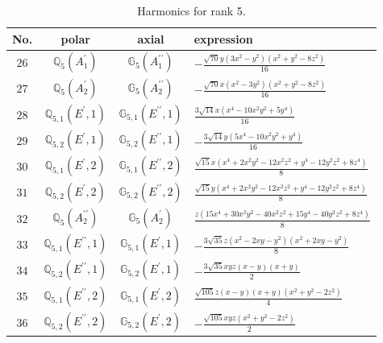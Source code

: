 \documentclass[fleqn,8pt,landscape]{jsarticle}
\begin{document}
\begin{table}[ht!]
\begin{center}
\caption{Harmonics for rank 5.}
\renewcommand{\arraystretch}{1.3}
\begin{tabular}{cccl} \hline \hline
No. & polar & axial & expression \\ \hline
$ 26 $ & $ \mathbb{Q}_{5}(A_{1}^{\prime}) $ & $ \mathbb{G}_{5}(A_{1}^{\prime\prime}) $ & $ - \frac{\sqrt{70} y \left(3 x^{2} - y^{2}\right) \left(x^{2} + y^{2} - 8 z^{2}\right)}{16} $ \\
$ 27 $ & $ \mathbb{Q}_{5}(A_{2}^{\prime}) $ & $ \mathbb{G}_{5}(A_{2}^{\prime\prime}) $ & $ - \frac{\sqrt{70} x \left(x^{2} - 3 y^{2}\right) \left(x^{2} + y^{2} - 8 z^{2}\right)}{16} $ \\
$ 28 $ & $ \mathbb{Q}_{5,1}(E^{\prime},1) $ & $ \mathbb{G}_{5,1}(E^{\prime\prime},1) $ & $ \frac{3 \sqrt{14} x \left(x^{4} - 10 x^{2} y^{2} + 5 y^{4}\right)}{16} $ \\
$ 29 $ & $ \mathbb{Q}_{5,2}(E^{\prime},1) $ & $ \mathbb{G}_{5,2}(E^{\prime\prime},1) $ & $ - \frac{3 \sqrt{14} y \left(5 x^{4} - 10 x^{2} y^{2} + y^{4}\right)}{16} $ \\
$ 30 $ & $ \mathbb{Q}_{5,1}(E^{\prime},2) $ & $ \mathbb{G}_{5,1}(E^{\prime\prime},2) $ & $ \frac{\sqrt{15} x \left(x^{4} + 2 x^{2} y^{2} - 12 x^{2} z^{2} + y^{4} - 12 y^{2} z^{2} + 8 z^{4}\right)}{8} $ \\
$ 31 $ & $ \mathbb{Q}_{5,2}(E^{\prime},2) $ & $ \mathbb{G}_{5,2}(E^{\prime\prime},2) $ & $ \frac{\sqrt{15} y \left(x^{4} + 2 x^{2} y^{2} - 12 x^{2} z^{2} + y^{4} - 12 y^{2} z^{2} + 8 z^{4}\right)}{8} $ \\
$ 32 $ & $ \mathbb{Q}_{5}(A_{2}^{\prime\prime}) $ & $ \mathbb{G}_{5}(A_{2}^{\prime}) $ & $ \frac{z \left(15 x^{4} + 30 x^{2} y^{2} - 40 x^{2} z^{2} + 15 y^{4} - 40 y^{2} z^{2} + 8 z^{4}\right)}{8} $ \\
$ 33 $ & $ \mathbb{Q}_{5,1}(E^{\prime\prime},1) $ & $ \mathbb{G}_{5,1}(E^{\prime},1) $ & $ - \frac{3 \sqrt{35} z \left(x^{2} - 2 x y - y^{2}\right) \left(x^{2} + 2 x y - y^{2}\right)}{8} $ \\
$ 34 $ & $ \mathbb{Q}_{5,2}(E^{\prime\prime},1) $ & $ \mathbb{G}_{5,2}(E^{\prime},1) $ & $ - \frac{3 \sqrt{35} x y z \left(x - y\right) \left(x + y\right)}{2} $ \\
$ 35 $ & $ \mathbb{Q}_{5,1}(E^{\prime\prime},2) $ & $ \mathbb{G}_{5,1}(E^{\prime},2) $ & $ \frac{\sqrt{105} z \left(x - y\right) \left(x + y\right) \left(x^{2} + y^{2} - 2 z^{2}\right)}{4} $ \\
$ 36 $ & $ \mathbb{Q}_{5,2}(E^{\prime\prime},2) $ & $ \mathbb{G}_{5,2}(E^{\prime},2) $ & $ - \frac{\sqrt{105} x y z \left(x^{2} + y^{2} - 2 z^{2}\right)}{2} $ \\
 \hline \hline
\end{tabular}
\end{center}
\end{table}
\end{document}
